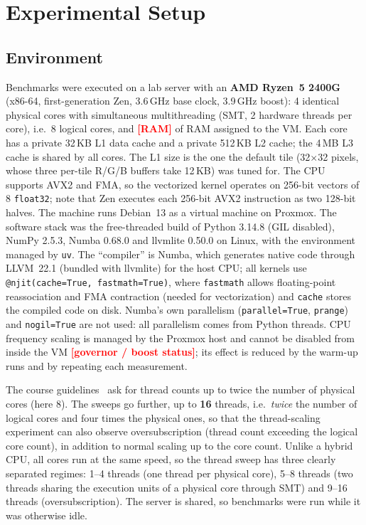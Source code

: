 \documentclass[10pt,twocolumn,letterpaper]{article}
\newcommand{\tbd}[1]{\textcolor{red}{\textbf{[#1]}}}
\begin{document}
\section{Experimental Setup}

\subsection{Environment}

Benchmarks were executed on a lab server with an \textbf{AMD Ryzen~5 2400G}
(x86-64, first-generation Zen, 3.6\,GHz base clock, 3.9\,GHz boost): 4
identical physical cores with simultaneous multithreading (SMT, 2 hardware
threads per core), i.e.\ 8 logical cores, and \tbd{RAM} of RAM assigned to
the VM. Each core has a private 32\,KB L1 data cache and a private
512\,KB L2 cache; the 4\,MB L3 cache is shared by all cores. The L1 size is
the one the default tile (32$\times$32 pixels, whose three per-tile R/G/B
buffers take 12\,KB) was tuned for. The CPU supports AVX2 and FMA, so the vectorized kernel
operates on 256-bit vectors of 8 \texttt{float32}; note that Zen executes
each 256-bit AVX2 instruction as two 128-bit halves. The machine runs Debian~13
as a virtual machine on Proxmox. The software stack was the free-threaded build of
Python 3.14.8 (GIL disabled), NumPy 2.5.3, Numba 0.68.0 and llvmlite 0.50.0
on Linux, with the environment managed by \texttt{uv}. The ``compiler'' is
Numba, which generates native code through LLVM~22.1 (bundled with
llvmlite) for the host CPU; all kernels use \texttt{@njit(cache=True,
fastmath=True)}, where \texttt{fastmath} allows floating-point
reassociation and FMA contraction (needed for vectorization) and
\texttt{cache} stores the compiled code on disk. Numba's own parallelism
(\texttt{parallel=True}, \texttt{prange}) and \texttt{nogil=True} are not
used: all parallelism comes from Python threads. CPU frequency scaling is
managed by the Proxmox host and cannot be disabled from inside the VM
\tbd{governor / boost status}; its effect is reduced by the warm-up runs
and by repeating each measurement.

The course guidelines~\cite{slides} ask for thread counts up to twice the
number of physical cores (here 8). The sweeps go further, up to
\textbf{16} threads, i.e.\ \emph{twice} the number of logical cores and
four times the physical ones, so that the thread-scaling experiment can also
observe oversubscription (thread count exceeding the logical core count), in
addition to normal scaling up to the core count. Unlike a hybrid CPU, all cores run at
the same speed, so the thread sweep has three clearly separated regimes:
1--4 threads (one thread per physical core), 5--8 threads (two threads
sharing the execution units of a physical core through SMT) and 9--16
threads (oversubscription). The server is shared, so benchmarks were run
while it was otherwise idle.
\end{document}
